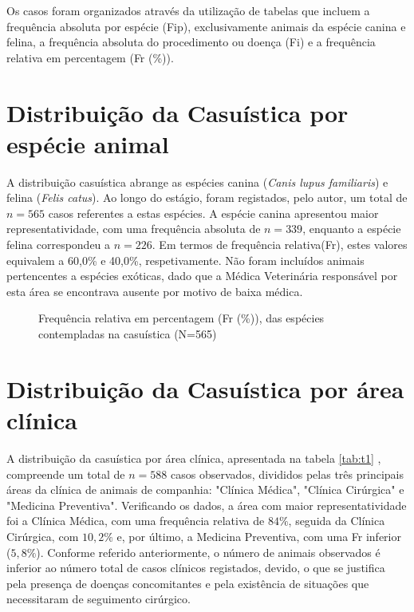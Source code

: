 Os casos foram organizados através da utilização de tabelas que incluem a frequência absoluta por espécie (Fip), exclusivamente animais da espécie canina e felina, a frequência absoluta do procedimento ou doença (Fi) e a frequência relativa em percentagem (Fr (\%)).

\section{Distribuição da Casuística por espécie animal}

A distribuição casuística abrange as espécies canina (\textit{Canis lupus familiaris}) e felina (\textit{Felis catus}). Ao longo do estágio, foram registados, pelo autor, um total de $n=565$ casos referentes a estas espécies. A espécie canina apresentou maior representatividade, com uma frequência absoluta de $n=339$, enquanto a espécie felina correspondeu a $n=226$. Em termos de frequência relativa(Fr), estes valores equivalem a 60,0\% e 40,0\%, respetivamente. Não foram incluídos animais pertencentes a espécies exóticas, dado que a Médica Veterinária responsável por esta área se encontrava ausente por motivo de baixa médica. 


\begin{figure}[h!]
  \centering
  \caption{Frequência relativa em percentagem (Fr (\%)), das espécies contempladas na 
casuística (N=565)}
  \label{fig:circular}
\end{figure}


\section{Distribuição da Casuística por área clínica}

A distribuição da casuística por área clínica, apresentada na tabela \ref{tab:t1} , compreende um total de $n=588$ casos observados, divididos pelas três principais áreas da clínica de animais de companhia: "Clínica Médica", "Clínica Cirúrgica" e "Medicina Preventiva". Verificando os dados, a área com maior representatividade foi a Clínica Médica, com uma frequência relativa de $84\%$, seguida da Clínica Cirúrgica, com  $10,2\%$ e, por último, a Medicina Preventiva, com uma Fr inferior ($5,8\%$). 
Conforme referido anteriormente, o número de animais observados é inferior ao número total de casos clínicos registados, devido, o que se justifica pela presença de doenças concomitantes e pela existência de situações que necessitaram de seguimento cirúrgico.

